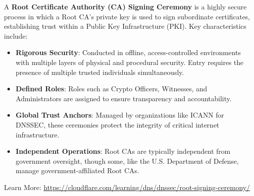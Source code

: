 \begin{Def}

    A \textbf{Root Certificate Authority (CA) Signing Ceremony} is a highly secure process in which a Root CA's private key is used to sign subordinate certificates, establishing trust within a Public Key Infrastructure (PKI). Key characteristics include:

    \begin{itemize}
        \item \textbf{Rigorous Security}: Conducted in offline, access-controlled environments with multiple layers of physical and procedural security. Entry requires the presence of multiple trusted individuals simultaneously.
        \item \textbf{Defined Roles}: Roles such as Crypto Officers, Witnesses, and Administrators are assigned to ensure transparency and accountability.
        \item \textbf{Global Trust Anchors}: Managed by organizations like ICANN for DNSSEC, these ceremonies protect the integrity of critical internet infrastructure.
        \item \textbf{Independent Operations}: Root CAs are typically independent from government oversight, though some, like the
        U.S. Department of Defense, manage government-affiliated Root CAs. 
    \end{itemize}
    Learn More: \href{https://www.cloudflare.com/learning/dns/dnssec/root-signing-ceremony/#:~:text=That%E2%80%99s%20the%20purpose%20of%20the%20Root%20Signing%20Ceremony%E2%80%94a,literally%20the%20key%20to%20the%20entire%20DNSSEC-protected%20Internet.}{https://cloudflare.com/learning/dns/dnssec/root-signing-ceremony/} \hfill \cite{cloudflare_root_signing}
\end{Def}

\newpage 

